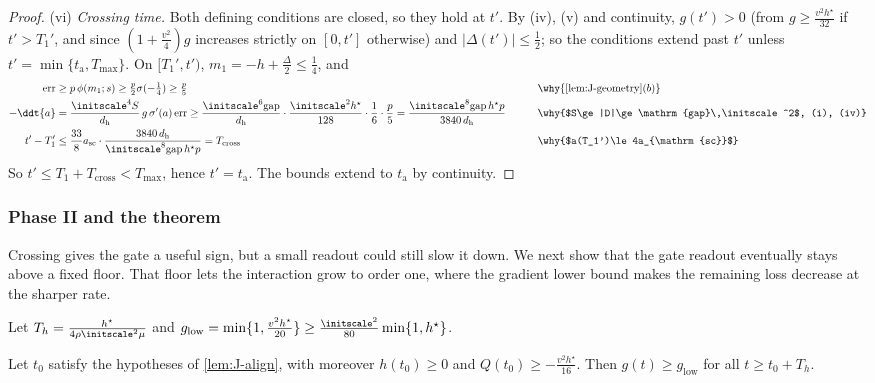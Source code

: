 \begin{proof}
\noindent(vi) \emph{Crossing time.} Both defining conditions are closed, so they hold at $t'$. By (iv), (v) and continuity, $g(t')>0$ (from
$g\ge\frac{v^2h^\star}{32}$ if $t'>T_1'$, and since $(1+\frac{v^2}{4})g$ increases strictly on $[0,t']$ otherwise) and $|\Delta(t')|\le\frac{1}{2}$; so the
conditions extend past $t'$ unless $t'=\min\{t_{\mathrm a},T_{\max}\}$. On $[T_1',t')$, $m_1=-h+\frac{\Delta}{2}\le\frac{1}{4}$, and
\begin{alignat*}{2}
 \mathrm{err}&\ge p\,\phi(m_1;s)\ge\tfrac{p}{2}\sigma(-\tfrac{1}{4})\ge\tfrac{p}{5} &\qquad& \why{\cref{lem:J-geometry}(b)}\\
 -\ddt{a}&=\frac{\initscale^4S}{d_{\mathrm h}}\,g\,\sigma'(a)\,\mathrm{err}\ge\frac{\initscale^6\mathrm{gap}}{d_{\mathrm h}}\cdot\frac{\initscale^2h^\star}{128}\cdot\frac{1}{6}\cdot\frac{p}{5}
 =\frac{\initscale^8\mathrm{gap}\,h^\star p}{3840\,d_{\mathrm h}} && \why{$S\ge|D|\ge\mathrm{gap}\,\initscale^2$, (i), (iv)}\\
 t'-T_1'&\le\frac{33}{8}a_{\mathrm{sc}}\cdot\frac{3840\,d_{\mathrm h}}{\initscale^8\mathrm{gap}\,h^\star p}=T_{\mathrm{cross}} && \why{$a(T_1')\le4a_{\mathrm{sc}}$}
\end{alignat*}
So $t'\le T_1+T_{\mathrm{cross}}<T_{\max}$, hence $t'=t_{\mathrm a}$. The bounds extend to $t_{\mathrm a}$ by continuity.
\end{proof}

\subsubsection{Phase II and the theorem}

Crossing gives the gate a useful sign, but a small readout could still slow it down. We next show that the gate readout eventually
stays above a fixed floor. That floor lets the interaction grow to order one, where the gradient lower bound makes the remaining
loss decrease at the sharper rate.

Let $T_h=\frac{h^\star}{4\rho\initscale^2\mu}$ and $g_{\mathrm{low}}=\min\{1,\frac{v^2h^\star}{20}\}\ge\frac{\initscale^2}{80}\min\{1,h^\star\}$.

\begin{lemma}
\label{lem:J-floor}
Let $t_0$ satisfy the hypotheses of \cref{lem:J-align}, with moreover $h(t_0)\ge0$ and $Q(t_0)\ge-\frac{v^2h^\star}{16}$. Then $g(t)\ge g_{\mathrm{low}}$ for all
$t\ge t_0+T_h$.
\end{lemma}

